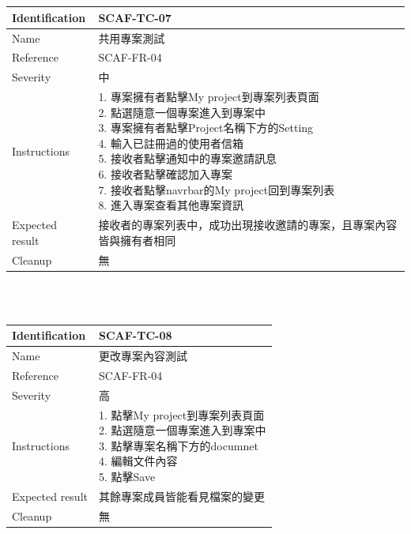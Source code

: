 \documentclass{report}
\begin{document}
\\
\newline
\\
\begin{tabularx}{\textwidth}{
  |p{}%
  |p{}|%
  }
  \hline
  \centering Identification &  SCAF-TC-07 \\
  \hline
  \centering Name & 共用專案測試 \\
  \hline
  \centering Reference & SCAF-FR-04 \\
  \hline
  \centering Severity & 中 \\
  \hline
  \centering Instructions & 
  \makecell[l]{
    1. 專案擁有者點擊My project到專案列表頁面 \\
    2. 點選隨意一個專案進入到專案中 \\
    3. 專案擁有者點擊Project名稱下方的Setting \\
    4. 輸入已註冊過的使用者信箱 \\
    5. 接收者點擊通知中的專案邀請訊息 \\
    6. 接收者點擊確認加入專案 \\
    7. 接收者點擊navrbar的My project回到專案列表 \\
    8. 進入專案查看其他專案資訊
  }\\
  \hline
  \centering Expected result & 接收者的專案列表中，成功出現接收邀請的專案，且專案內容皆與擁有者相同 \\
  \hline
  \centering Cleanup & 無 \\
  \hline
\end{tabularx}
\\
\newline
\\
\begin{tabularx}{\textwidth}{
  |p{}%
  |p{}|%
  }
  \hline
  \centering Identification &  SCAF-TC-08 \\
  \hline
  \centering Name & 更改專案內容測試 \\
  \hline
  \centering Reference & SCAF-FR-04 \\
  \hline
  \centering Severity & 高 \\
  \hline
  \centering Instructions & 
  \makecell[l]{
    1. 點擊My project到專案列表頁面 \\
    2. 點選隨意一個專案進入到專案中 \\
    3. 點擊專案名稱下方的documnet \\
    4. 編輯文件內容 \\
    5. 點擊Save
  }\\
  \hline
  \centering Expected result & 其餘專案成員皆能看見檔案的變更 \\
  \hline
  \centering Cleanup & 無 \\
  \hline
\end{tabularx}
\end{document}

